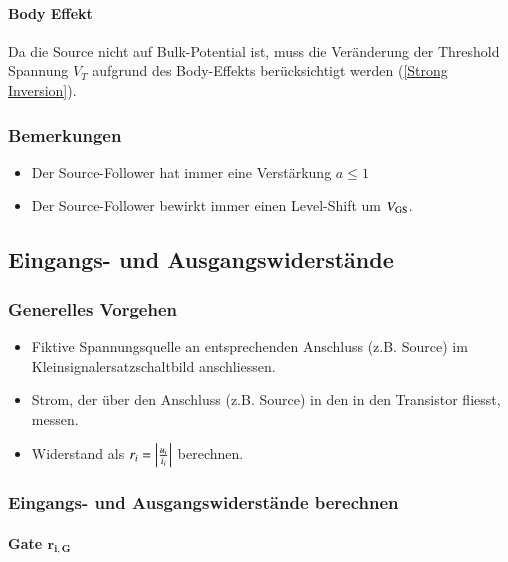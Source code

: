 \paragraph{Body Effekt}
Da die Source nicht auf Bulk-Potential ist, muss die Veränderung der Threshold Spannung $V_T$ aufgrund des Body-Effekts berücksichtigt werden (\ref{Strong Inversion}).


\subsubsection{Bemerkungen}
\begin{itemize}
    \item Der Source-Follower hat immer eine Verstärkung $a \leq 1$
    \item Der Source-Follower bewirkt immer einen Level-Shift um $V_{\rm GS}$.
\end{itemize}



\subsection{Eingangs- und Ausgangswiderstände}

\subsubsection{Generelles Vorgehen}

\begin{itemize}
    \item Fiktive Spannungsquelle an entsprechenden Anschluss (z.B. Source) im Kleinsignalersatzschaltbild anschliessen.
    \item Strom, der über den Anschluss (z.B. Source) in den in den Transistor fliesst, messen.
    \item Widerstand als $r_i = \left| \frac{u_i}{i_i} \right|$ berechnen.
\end{itemize}


\subsubsection{Eingangs- und Ausgangswiderstände berechnen}

\paragraph{Gate $\bm{r_{i,G}}$}

\vspace{-0.2cm}

